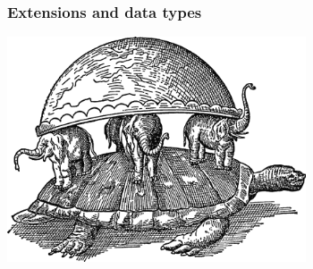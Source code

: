\documentclass{beamer}
\begin{document}
\begin{frame}[fragile]
  \frametitle{Extensions and data types}

\begin{center}
  \includegraphics[height=18em]{extensions.png}
\end{center}
\end{frame}
\end{document}
